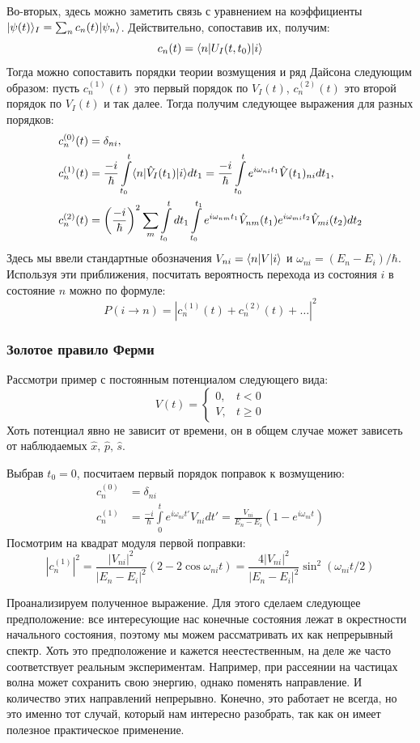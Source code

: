 Во-вторых, здесь можно заметить связь с уравнением на коэффициенты \\
$\lvert\psi(t)\rangle_I = \sum_n c_n(t)\lvert\psi_n\rangle$. Действительно, сопоставив их,
получим:
\[
  c_n(t) = \langle n\rvert U_{I}(t, t_0)\lvert i\rangle
\]
Тогда можно сопоставить порядки теории возмущения и ряд Дайсона следующим
образом: пусть $c_n^{(1)}(t)$ это первый порядок по $V_I(t)$, $c_n^{(2)}(t)$
это второй порядок по $V_I(t)$ и так далее. Тогда получим следующее выражения
для разных порядков:
\begin{align*}
  c^{(0)}_n (t) &= \delta_{ni},\\
  c^{(1)}_n(t) &= \frac{-i}{\hbar} \int\limits_{t_0}^{t}\langle n\rvert\hat{V}_I(t_1)\lvert i\rangle dt_1 = \frac{-i}{\hbar} \int\limits_{t_0}^{t}e^{i\omega_{ni}t_1}\hat{V}(t_1)_{ni}dt_1,\\
  c^{(2)}_n (t) &= \left(\frac{-i}{\hbar}\right)^2 \sum_m\int\limits_{t_0}^{t}dt_1 \int\limits_{t_0}^{t_1}e^{i\omega_{nm}t_1}\hat{V}_{nm}(t_1)e^{i\omega_{mi}t_2}\hat{V}_{mi}(t_2)dt_2
\end{align*}
Здесь мы ввели стандартные обозначения $V_{ni} = \langle n\rvert V\lvert i\rangle$ и
$\omega_{ni} = (E_n - E_i)/\hbar$. Используя эти приближения, посчитать
вероятность перехода из состояния $i$ в состояние $n$ можно по формуле:
\[
  P(i \rightarrow n) = |c_n^{(1)}(t) + c_n^{(2)}(t) + \dots|^2
\]
\subsubsection{Золотое правило Ферми}
Рассмотри пример с постоянным потенциалом следующего вида:
\[
  V(t) = \begin{cases}0,&t<0 \\ V, &t\geq0\end{cases}
\]
Хоть потенциал явно не зависит от времени, он в общем случае может зависеть от
наблюдаемых $\hat{x},\, \hat{p},\, \hat{s}$.

Выбрав $t_0 = 0$, посчитаем первый порядок поправок к возмущению:
\begin{align*}
  c^{(0)}_n &= \delta_{ni}\\
  c^{(1)}_n &= \frac{-i}{\hbar}\int\limits_{0}^{t}e^{i\omega_{ni} t'}V_{ni}dt' = \frac{V_{ni}}{E_n-E_i}(1-e^{i\omega_{ni}t})
\end{align*}
Посмотрим на квадрат модуля первой поправки:
\[
  |c^{(1)}_n|^2 = \frac{|V_{ni}|^2}{|E_n-E_i|^2}(2-2\cos\omega_{ni}t) = \frac{4|V_{ni}|^2}{|E_n-E_i|^2}\sin^2\left(\omega_{ni}t/2\right)
\]

Проанализируем полученное выражение. Для этого сделаем следующее предположение:
все интересующие нас конечные состояния лежат в окрестности начального
состояния, поэтому мы можем рассматривать их как непрерывный спектр. Хоть это
предположение и кажется неестественным, на деле же часто соответствует реальным
экспериментам. Например, при рассеянии на частицах волна может сохранить свою
энергию, однако поменять направление. И количество этих направлений непрерывно.
Конечно, это работает не всегда, но это именно тот случай, который нам
интересно разобрать, так как он имеет полезное практическое применение.

